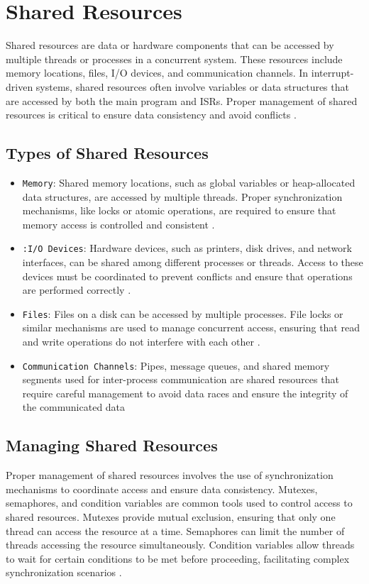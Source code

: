 \documentclass[
fancyheadings, %
%
%
]{stsreprt}
\begin{document}
{\section{Shared Resources}
Shared resources are data or hardware components that can be accessed by multiple threads or processes in a concurrent system. These resources include memory locations, files, I/O devices, and communication channels. In interrupt-driven systems, shared resources often involve variables or data structures that are accessed by both the main program and ISRs. Proper management of shared resources is critical to ensure data consistency and avoid conflicts \cite{herlihy2008}.
\subsection{Types of Shared Resources}
\begin{itemize}
	\item \texttt{Memory}: Shared memory locations, such as global variables or heap-allocated data structures, are accessed by multiple threads. Proper synchronization mechanisms, like locks or atomic operations, are required to ensure that memory access is controlled and consistent \cite{herlihy2008}.

	\item \texttt{:I/O Devices}: Hardware devices, such as printers, disk drives, and network interfaces, can be shared among different processes or threads. Access to these devices must be coordinated to prevent conflicts and ensure that operations are performed correctly \cite{burns2009}.

	\item \texttt{Files}: Files on a disk can be accessed by multiple processes. File locks or similar mechanisms are used to manage concurrent access, ensuring that read and write operations do not interfere with each other \cite{labrosse2002}.

	\item \texttt{Communication Channels}: Pipes, message queues, and shared memory segments used for inter-process communication are shared resources that require careful management to avoid data races and ensure the integrity of the communicated data \cite{herlihy2008}
\end{itemize}
\subsection{Managing Shared Resources}
Proper management of shared resources involves the use of synchronization mechanisms to coordinate access and ensure data consistency. Mutexes, semaphores, and condition variables are common tools used to control access to shared resources. Mutexes provide mutual exclusion, ensuring that only one thread can access the resource at a time. Semaphores can limit the number of threads accessing the resource simultaneously. Condition variables allow threads to wait for certain conditions to be met before proceeding, facilitating complex synchronization scenarios \cite{herlihy2008}.

}
\end{document}

